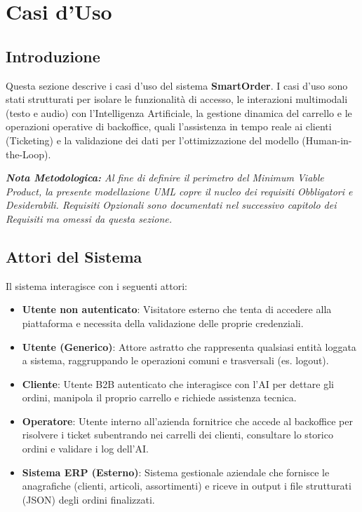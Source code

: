 \documentclass[a4paper, 11pt, oneside]{scrartcl} %
\begin{document}
\newpage
\section{Casi d'Uso}

\subsection{Introduzione}
Questa sezione descrive i casi d'uso del sistema \textbf{SmartOrder}. I casi d'uso sono stati strutturati per isolare le funzionalità di accesso, le interazioni multimodali (testo e audio) con l'Intelligenza Artificiale, la gestione dinamica del carrello e le operazioni operative di backoffice, quali l'assistenza in tempo reale ai clienti (Ticketing) e la validazione dei dati per l'ottimizzazione del modello (Human-in-the-Loop).

\vspace{0.3cm}
\noindent\textit{\textbf{Nota Metodologica:} Al fine di definire il perimetro del Minimum Viable Product, la presente modellazione UML copre il nucleo dei requisiti Obbligatori e Desiderabili. Requisiti Opzionali sono documentati nel successivo capitolo dei Requisiti ma omessi da questa sezione.}

\subsection{Attori del Sistema}
Il sistema interagisce con i seguenti attori:
\begin{itemize}
    \item \textbf{Utente non autenticato}: Visitatore esterno che tenta di accedere alla piattaforma e necessita della validazione delle proprie credenziali.
    \item \textbf{Utente (Generico)}: Attore astratto che rappresenta qualsiasi entità loggata a sistema, raggruppando le operazioni comuni e trasversali (es. logout).
    \item \textbf{Cliente}: Utente B2B autenticato che interagisce con l'AI per dettare gli ordini, manipola il proprio carrello e richiede assistenza tecnica.
    \item \textbf{Operatore}: Utente interno all'azienda fornitrice che accede al backoffice per risolvere i ticket subentrando nei carrelli dei clienti, consultare lo storico ordini e validare i log dell'AI.
    \item \textbf{Sistema ERP (Esterno)}: Sistema gestionale aziendale che fornisce le anagrafiche (clienti, articoli, assortimenti) e riceve in output i file strutturati (JSON) degli ordini finalizzati.
\end{itemize}






\end{document}
